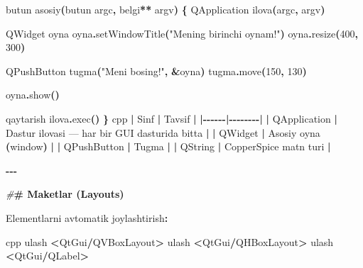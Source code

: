 \documentclass[a4paper,11pt,twoside,openright]{book}
\newenvironment{Shaded}{\begin{snugshade}}{\end{snugshade}}
\newcommand{\DecValTok}[1]{\textcolor[rgb]{0.00,0.00,0.81}{#1}}
\newcommand{\ErrorTok}[1]{\textcolor[rgb]{0.64,0.00,0.00}{\textbf{#1}}}
\newcommand{\ExtensionTok}[1]{#1}
\newcommand{\NormalTok}[1]{#1}
\newcommand{\OperatorTok}[1]{\textcolor[rgb]{0.81,0.36,0.00}{\textbf{#1}}}
\newcommand{\PreprocessorTok}[1]{\textcolor[rgb]{0.56,0.35,0.01}{\textit{#1}}}
\newcommand{\StringTok}[1]{\textcolor[rgb]{0.31,0.60,0.02}{#1}}
\begin{document}
\begin{Shaded}
\begin{Highlighting}[]
\NormalTok{butun asosiy}\OperatorTok{(}\NormalTok{butun argc}\OperatorTok{,}\NormalTok{ belgi}\OperatorTok{**}\NormalTok{ argv}\OperatorTok{)} \OperatorTok{\{}
    \ExtensionTok{QApplication}\NormalTok{ ilova}\OperatorTok{(}\NormalTok{argc}\OperatorTok{,}\NormalTok{ argv}\OperatorTok{)}

    \ExtensionTok{QWidget}\NormalTok{ oyna}
\NormalTok{    oyna}\OperatorTok{.}\NormalTok{setWindowTitle}\OperatorTok{(}\StringTok{"Mening birinchi oynam!"}\OperatorTok{)}
\NormalTok{    oyna}\OperatorTok{.}\NormalTok{resize}\OperatorTok{(}\DecValTok{400}\OperatorTok{,} \DecValTok{300}\OperatorTok{)}

    \ExtensionTok{QPushButton}\NormalTok{ tugma}\OperatorTok{(}\StringTok{"Meni bosing!"}\OperatorTok{,} \OperatorTok{\&}\NormalTok{oyna}\OperatorTok{)}
\NormalTok{    tugma}\OperatorTok{.}\NormalTok{move}\OperatorTok{(}\DecValTok{150}\OperatorTok{,} \DecValTok{130}\OperatorTok{)}

\NormalTok{    oyna}\OperatorTok{.}\NormalTok{show}\OperatorTok{()}

\NormalTok{    qaytarish ilova}\OperatorTok{.}\NormalTok{exec}\OperatorTok{()}
\OperatorTok{\}}
\ErrorTok{\textasciigrave{}\textasciigrave{}\textasciigrave{}}\NormalTok{cpp}
\OperatorTok{|}\NormalTok{ Sinf }\OperatorTok{|}\NormalTok{ Tavsif }\OperatorTok{|}
\OperatorTok{|{-}{-}{-}{-}{-}{-}|{-}{-}{-}{-}{-}{-}{-}{-}|}
\OperatorTok{|} \ErrorTok{\textasciigrave{}}\NormalTok{QApplication}\ErrorTok{\textasciigrave{}} \OperatorTok{|}\NormalTok{ Dastur ilovasi — har bir GUI dasturida bitta }\OperatorTok{|}
\OperatorTok{|} \ErrorTok{\textasciigrave{}}\NormalTok{QWidget}\ErrorTok{\textasciigrave{}} \OperatorTok{|}\NormalTok{ Asosiy oyna }\OperatorTok{(}\NormalTok{window}\OperatorTok{)} \OperatorTok{|}
\OperatorTok{|} \ErrorTok{\textasciigrave{}}\NormalTok{QPushButton}\ErrorTok{\textasciigrave{}} \OperatorTok{|}\NormalTok{ Tugma }\OperatorTok{|}
\OperatorTok{|} \ErrorTok{\textasciigrave{}}\NormalTok{QString}\ErrorTok{\textasciigrave{}} \OperatorTok{|}\NormalTok{ CopperSpice matn turi }\OperatorTok{|}

\OperatorTok{{-}{-}{-}}

\PreprocessorTok{\#}\ErrorTok{\# Maketlar (Layouts)}

\NormalTok{Elementlarni avtomatik joylashtirish}\OperatorTok{:}

\ErrorTok{\textasciigrave{}\textasciigrave{}\textasciigrave{}}\NormalTok{cpp}
\NormalTok{ulash }\OperatorTok{\textless{}}\NormalTok{QtGui}\OperatorTok{/}\ExtensionTok{QVBoxLayout}\OperatorTok{\textgreater{}}
\NormalTok{ulash }\OperatorTok{\textless{}}\NormalTok{QtGui}\OperatorTok{/}\ExtensionTok{QHBoxLayout}\OperatorTok{\textgreater{}}
\NormalTok{ulash }\OperatorTok{\textless{}}\NormalTok{QtGui}\OperatorTok{/}\ExtensionTok{QLabel}\OperatorTok{\textgreater{}}


\end{Highlighting}
\end{Shaded}
\end{document}
